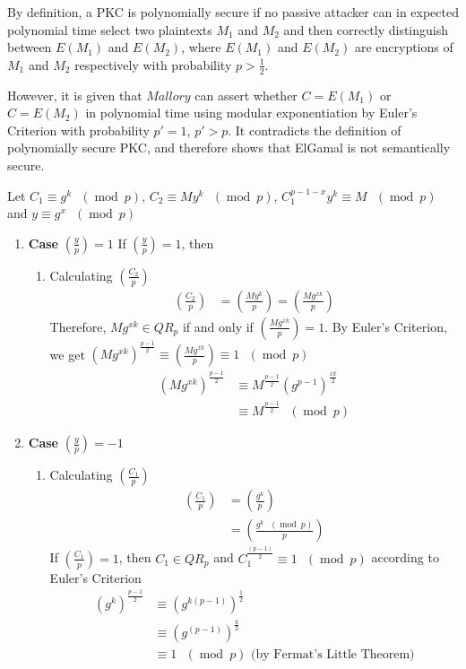 \documentclass[11pt]{article}
\theoremstyle{definition}
\renewcommand{\pmod}[1]{\mbox{\ $(\ensuremath{\operatorname{mod}}\ {#1})$}}
\providecommand{\Leg}[2]{\genfrac{(}{)}{}{}{#1}{#2}}
\newcommand{\M}{Mallory}
\begin{document}
\begin{enumerate}
By definition, a PKC is polynomially secure if no passive attacker can in expected polynomial time select two plaintexts $M_1$ and $M_2$ and then correctly distinguish between $E(M_1)$ and $E(M_2)$, where $E(M_1)$ and $E(M_2)$ are encryptions of $M_1$ and $M_2$ respectively with probability $p > \frac{1}{2}$.

  However, it is given that $\M$ can assert whether $C = E(M_1)$ or $C = E(M_2)$ in polynomial time using modular exponentiation by Euler's Criterion with probability $p' = 1$, $p' > p$. It contradicts the definition of polynomially secure PKC, and therefore shows that ElGamal is not semantically secure.

  Let $C_1 \equiv g^k \pmod{p}$, $C_2 \equiv My^{k} \pmod{p}$, $C^{p - 1 - x}_1y^{k} \equiv M \pmod{p}$ and $y \equiv g^x \pmod{p}$

  \begin{enumerate}
    \item[] \textbf{Case} $\Leg{y}{p} = 1$
      If $\Leg{y}{p} = 1$, then 
      \begin{enumerate}
        \item[] Calculating $\Leg{C_2}{p}$
          \begin{align*}
            \Leg{C_2}{p} &= \Leg{My^k}{p} = \Leg{Mg^{xk}}{p}
          \end{align*}
          Therefore, $Mg^{xk} \in QR_p$ if and only if $\Leg{Mg^{xk}}{p} = 1$. By Euler's Criterion, we get $(Mg^{xk})^{\frac{p - 1}{2}} \equiv \Leg{Mg^{xk}}{p} \equiv 1 \pmod{p}$
          \begin{align*}
            (Mg^{xk})^{\frac{p - 1}{2}} &\equiv M^{\frac{p - 1}{2}}(g^{p - 1})^{\frac{xk}{2}} \\
                                        &\equiv M^{\frac{p - 1}{2}} \pmod{p}
          \end{align*}

      \end{enumerate}
    \item[] \textbf{Case} $\Leg{y}{p} = -1$
      \begin{enumerate}
        \item[] Calculating $\Leg{C_1}{p}$
          \begin{align*}
            \Leg{C_1}{p} &= \Leg{g^{k}}{p} \\
                         &= \Leg{g^{k} \pmod{p}}{p}
          \end{align*}
          If $\Leg{C_1}{p} = 1$, then $C_1 \in QR_p$ and $C_1^{\frac{(p - 1)}{2}} \equiv 1 \pmod{p}$ according to Euler's Criterion
          \begin{align*}
          (g^k)^{\frac{p - 1}{2}} &\equiv (g^{k(p - 1)})^{\frac{1}{2}} \\
                                  &\equiv (g^{(p - 1)})^{\frac{k}{2}} \\
                                  &\equiv 1 \pmod{p} \text{ (by Fermat's Little Theorem)}
          \end{align*}


\end{enumerate}
\end{enumerate}
\end{enumerate}
\end{document}
